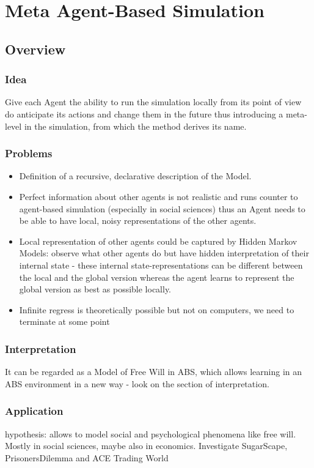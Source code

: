 \section{Meta Agent-Based Simulation}

\subsection{Overview}
\subsubsection{Idea} Give each  Agent the ability to run the simulation locally from its point of view do anticipate its actions and change them in the future thus introducing a meta-level in the simulation, from which the method derives its name.
\subsubsection{Problems} 
\begin{itemize}
	\item Definition of a recursive, declarative description of the Model.
	\item Perfect information about other agents is not realistic and runs counter to agent-based simulation (especially in social sciences) thus an Agent needs to be able to have local, noisy representations of the other agents.
	\item Local representation of other agents could be captured by Hidden Markov Models: observe what other agents do but have hidden interpretation of their internal state - these internal state-representations can be different between the local and the global version whereas the agent learns to represent the global version as best as possible locally.
	\item Infinite regress is theoretically possible but not on computers, we need to terminate at some point
\end{itemize}

\subsubsection{Interpretation} It can be regarded as a Model of Free Will in ABS, which allows learning in an ABS environment in a new way - look on the section of interpretation.
\subsubsection{Application} hypothesis: allows to model social and psychological phenomena like free will. Mostly in social sciences, maybe also in economics. Investigate SugarScape, PrisonersDilemma and ACE Trading World
